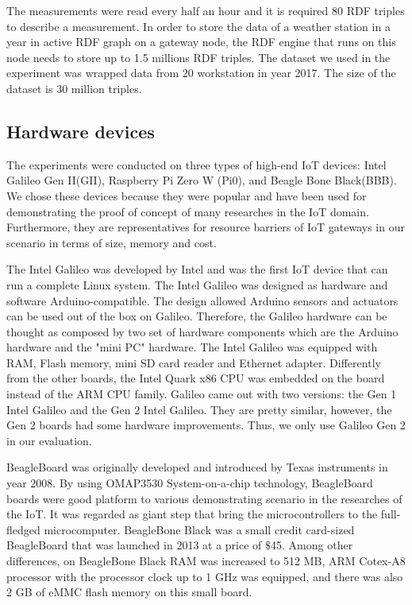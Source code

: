 The measurements were read every half an hour and it is required 80 RDF triples to describe a measurement.
In order to store the data of a weather station in a year in active RDF graph on a gateway node, the RDF engine that runs on this node needs to store up to 1.5 millions RDF triples.
The dataset we used in the experiment was wrapped data from 20 workstation in year 2017.
The size of the dataset is 30 million triples.

\subsection{Hardware devices}

The experiments were conducted on three types of high-end IoT devices: Intel Galileo Gen II(GII), Raspberry Pi Zero W (Pi0), and Beagle Bone Black(BBB).
We chose these devices because they were popular and have been used for demonstrating the proof of concept of many researches in the IoT domain.
Furthermore, they are representatives for resource barriers of IoT gateways in our scenario in terms of size, memory and cost.

The Intel Galileo was developed by Intel and was the first IoT device that can run a complete Linux system.
The Intel Galileo was designed as hardware and software Arduino-compatible.
The design allowed Arduino sensors and actuators can be used out of the box on Galileo. 
Therefore, the Galileo hardware can be thought as composed by two set of hardware components which are the Arduino hardware and the "mini PC" hardware.
The Intel Galileo was equipped with RAM, Flash memory, mini SD card reader and Ethernet adapter.
Differently from the other boards, the Intel Quark x86 CPU was embedded on the board instead of the ARM CPU family.
Galileo came out with two versions: the Gen 1 Intel Galileo  and the Gen 2 Intel Galileo.
They are pretty similar, however, the Gen 2 boards had some hardware improvements.
Thus, we only use Galileo Gen 2 in our evaluation.

BeagleBoard was originally developed and introduced by Texas instruments in year 2008.
By using OMAP3530 System-on-a-chip technology, BeagleBoard boards were good platform to various demonstrating scenario in the researches of the IoT.
It was regarded as giant step that bring the microcontrollers to the full-fledged microcomputer. 
BeagleBone Black was a small credit card-sized BeagleBoard that was launched in 2013 at a price of $\$$45. 
Among other differences, on BeagleBone Black RAM was increased to 512 MB, ARM Cotex-A8 processor with the processor clock up to 1 GHz was equipped, and there was also 2 GB of eMMC flash memory on this small board. 

